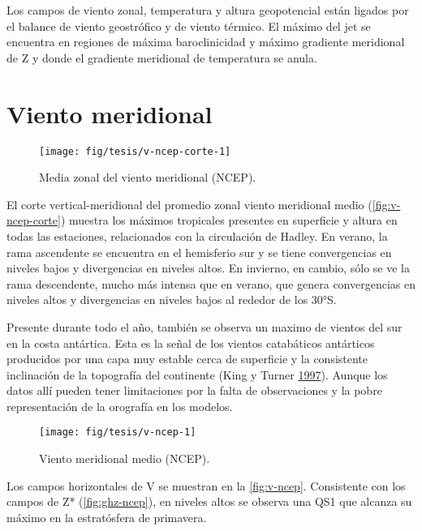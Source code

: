 \documentclass[spanish,a4paper,12p]{book}
\begin{document}
Los campos de viento zonal, temperatura y altura geopotencial están
ligados por el balance de viento geostrófico y de viento térmico. El
máximo del jet se encuentra en regiones de máxima baroclinicidad y
máximo gradiente meridional de Z y donde el gradiente meridional de
temperatura se anula.

\section{Viento meridional}\label{viento-meridional}

\begin{figure*}
\texttt{[image: fig/tesis/v-ncep-corte-1]} \caption{Media zonal del viento meridional (NCEP).}\label{fig:v-ncep-corte}
\end{figure*}

El corte vertical-meridional del promedio zonal viento meridional medio
(\autoref{fig:v-ncep-corte}) muestra los máximos tropicales presentes en
superficie y altura en todas las estaciones, relacionados con la
circulación de Hadley. En verano, la rama ascendente se encuentra en el
hemisferio sur y se tiene convergencias en niveles bajos y divergencias
en niveles altos. En invierno, en cambio, sólo se ve la rama
descendente, mucho más intensa que en verano, que genera convergencias
en niveles altos y divergencias en niveles bajos al rededor de los 30°S.

Presente durante todo el año, también se observa un maximo de vientos
del sur en la costa antártica. Esta es la señal de los vientos
catabáticos antárticos producidos por una capa muy estable cerca de
superficie y la consistente inclinación de la topografía del continente
(King y Turner \protect\hyperlink{ref-King1997}{1997}). Aunque los datos
allí pueden tener limitaciones por la falta de observaciones y la pobre
representación de la orografía en los modelos.

\begin{landscape}\begin{figure}

{\centering \texttt{[image: fig/tesis/v-ncep-1]} 

}

\caption{Viento meridional medio (NCEP).}\label{fig:v-ncep}
\end{figure}
\end{landscape}

Los campos horizontales de V se muestran en la \autoref{fig:v-ncep}.
Consistente con los campos de Z* (\autoref{fig:ghz-ncep}), en niveles
altos se observa una QS1 que alcanza su máximo en la estratósfera de
primavera.
\end{document}
